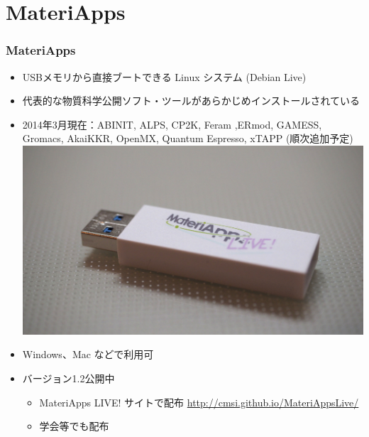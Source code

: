 \section{MateriApps}

\begin{frame}
 \frametitle{MateriApps}
 \begin{itemize}
   \item USBメモリから直接ブートできる Linux システム (Debian Live)
   \item 代表的な物質科学公開ソフト・ツールがあらかじめインストールされている
   \item 2014年3月現在：ABINIT, ALPS, CP2K, Feram ,ERmod, GAMESS, Gromacs, AkaiKKR, OpenMX, Quantum Espresso, xTAPP (順次追加予定)
     \hspace*{7cm}
     \includegraphics[width=0.3\linewidth,bb=0 0 4096 2268]{materiappslive.jpg}
     \vspace*{-1.0cm}
   \item Windows、Mac などで利用可
   \item バージョン1.2公開中
     \begin{itemize}
     \item MateriApps LIVE! サイトで配布 \url{http://cmsi.github.io/MateriAppsLive/}
     \item 学会等でも配布
     \end{itemize}
 \end{itemize}
\end{frame}


